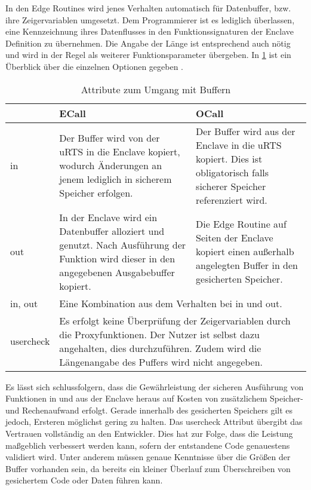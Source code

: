 In den Edge Routines wird jenes Verhalten automatisch für Datenbuffer, bzw. ihre Zeigervariablen umgesetzt. Dem Programmierer ist es lediglich überlassen, eine Kennzeichnung ihres Datenflusses in den Funktionssignaturen der Enclave Definition zu übernehmen. Die Angabe der Länge ist entsprechend auch nötig und wird in der Regel als weiterer Funktionsparameter übergeben. In \ref{tab:sgxbuffer} ist ein Überblick über die einzelnen Optionen gegeben \cite{LinuxGuide}.

\begin{table}[h]
	\centering
	\caption{Attribute zum Umgang mit Buffern}
	\begin{tabularx}{\textwidth}{|l|X|X|}
		\hline
		& \textbf{\ac{ECall}} & \textbf{\ac{OCall}} \\
		\hline
		in & Der Buffer wird von der uRTS in die Enclave kopiert, wodurch Änderungen an jenem lediglich in sicherem Speicher erfolgen. & Der Buffer wird aus der Enclave in die uRTS kopiert. Dies ist obligatorisch falls sicherer Speicher referenziert wird. \\
		\hline
		out & In der Enclave wird ein Datenbuffer alloziert und genutzt. Nach Ausführung der Funktion wird dieser in den angegebenen Ausgabebuffer kopiert. & Die Edge Routine auf Seiten der Enclave kopiert einen außerhalb angelegten Buffer in den gesicherten Speicher. \\
		\hline
		in, out & \multicolumn{2}{l|}{Eine Kombination aus dem Verhalten bei in und out.} \\
		\hline
		user\textunderscore check & \multicolumn{2}{p{0.8\textwidth}|}{Es erfolgt keine Überprüfung der Zeigervariablen durch die Proxyfunktionen. Der Nutzer ist selbst dazu angehalten, dies durchzuführen. Zudem wird die Längenangabe des Puffers wird nicht angegeben.} \\
		\hline
	\end{tabularx}
	\label{tab:sgxbuffer}
\end{table}

Es lässt sich schlussfolgern, dass die Gewährleistung der sicheren Ausführung von Funktionen in und aus der Enclave heraus auf Kosten von zusätzlichem Speicher- und Rechenaufwand erfolgt. Gerade innerhalb des gesicherten Speichers gilt es jedoch, Ersteren möglichst gering zu halten. Das user\textunderscore check Attribut übergibt das Vertrauen vollständig an den Entwickler. Dies hat zur Folge, dass die Leistung maßgeblich verbessert werden kann, sofern der entstandene Code genauestens validiert wird. Unter anderem müssen genaue Kenntnisse über die Größen der Buffer vorhanden sein, da bereits ein kleiner Überlauf zum Überschreiben von gesichertem Code oder Daten führen kann.

